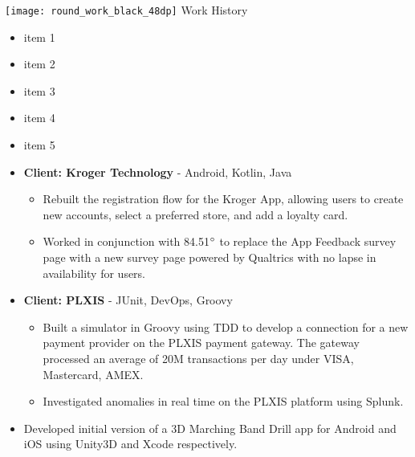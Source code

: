 {\noindent \texttt{[image: round\_work\_black\_48dp]} \hspace{0.25pc}  \large Work History}\hspace{1pc}{\noindent\rule{36.75pc}{0.4pt}}
\vspace{1pc}

\begin{itemize}
	\item item 1
	\item item 2
	\item item 3
	\item item 4
	\item item 5
\end{itemize}

\vspace{1pc}


\begin{itemize}
	\item \textbf{Client: Kroger Technology} - Android, Kotlin, Java
	\begin{itemize}
		\item Rebuilt the registration flow for the Kroger App, allowing users to create new accounts, select a preferred store, and add a loyalty card. 
		
		\item Worked in conjunction with 84.51$\degree$ to replace the App Feedback survey page with a new survey page powered by Qualtrics with no lapse in availability for users.
	\end{itemize}
	\item \textbf{Client: PLXIS} - JUnit, DevOps, Groovy
	\begin{itemize}
		\item Built a simulator in Groovy using TDD to develop a connection for a new payment provider on the PLXIS payment gateway. The gateway processed an average of 20M transactions per day under VISA, Mastercard, AMEX.
		
		\item Investigated anomalies in real time on the PLXIS platform using Splunk.
	\end{itemize}
	
\end{itemize}

\begin{itemize}
	\item Developed initial version of a 3D Marching Band Drill app for Android and iOS using Unity3D and Xcode respectively.
\end{itemize}